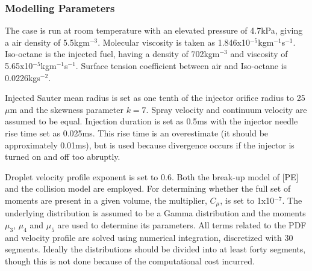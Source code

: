 \documentclass[a4paper,10pt]{article}
\begin{document}



\subsubsection{Modelling Parameters}
The case is run at room temperature with an elevated pressure of 4.7kPa, giving a air density of 5.5kgm$^{-3}$. Molecular viscosity is taken as 1.846x10$^{-5}$kgm$^{-1}$s$^{-1}$. Iso-octane is the injected fuel, having a density of 702kgm$^{-3}$ and viscosity of 5.65x10$^{-5}$kgm$^{-1}$s$^{-1}$. Surface tension coefficient between air and Iso-octane is 0.0226kgs$^{-2}$.

Injected Sauter mean radius is set as one tenth of the injector orifice radius to 25$\mu$m and the skewness parameter $k=7$. Spray velocity and continuum velocity are assumed to be equal. Injection duration is set as 0.5ms with the injector needle rise time set as 0.025ms. This rise time is an overestimate (it should be approximately 0.01ms), but is used because divergence occurs if the injector is turned on and off too abruptly.

Droplet velocity profile exponent is set to 0.6. Both the break-up model of \cite{pilch1987} [PE] and the collision model are employed. For determining whether the full set of moments are present in a given volume, the multiplier, $C_{\mu}$, is set to 1x10$^{-7}$. The underlying distribution is assumed to be a Gamma distribution and the moments $\mu_3$, $\mu_4$ and $\mu_5$ are used to determine its parameters. All terms related to the PDF and velocity profile are solved using numerical integration, discretized with 30 segments. Ideally the distributions should be divided into at least forty segments, though this is not done because of the computational cost incurred.
\end{document}
